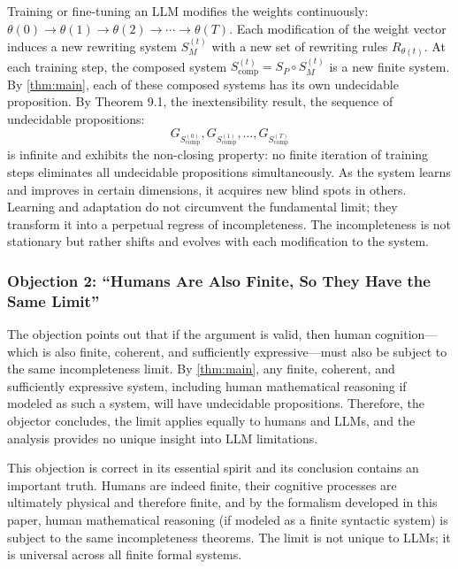 \documentclass[11pt]{article}
\begin{document}
Training or fine-tuning an LLM modifies the weights continuously: $\theta(0) \to \theta(1) \to \theta(2) \to \cdots \to \theta(T)$. Each modification of the weight vector induces a new rewriting system $S_M^{(t)}$ with a new set of rewriting rules $R_{\theta(t)}$. At each training step, the composed system $S_{\text{comp}}^{(t)} = S_P \circ S_M^{(t)}$ is a new finite system. By \ref{thm:main}, each of these composed systems has its own undecidable proposition. By Theorem 9.1, the inextensibility result, the sequence of undecidable propositions:
\begin{equation}
G_{S_{\text{comp}}^{(0)}}, G_{S_{\text{comp}}^{(1)}}, \ldots, G_{S_{\text{comp}}^{(T)}}
\end{equation}
is infinite and exhibits the non-closing property: no finite iteration of training steps eliminates all undecidable propositions simultaneously. As the system learns and improves in certain dimensions, it acquires new blind spots in others. Learning and adaptation do not circumvent the fundamental limit; they transform it into a perpetual regress of incompleteness. The incompleteness is not stationary but rather shifts and evolves with each modification to the system.

\subsubsection{Objection 2: ``Humans Are Also Finite, So They Have the Same Limit''}

The objection points out that if the argument is valid, then human cognition—which is also finite, coherent, and sufficiently expressive—must also be subject to the same incompleteness limit. By \ref{thm:main}, any finite, coherent, and sufficiently expressive system, including human mathematical reasoning if modeled as such a system, will have undecidable propositions. Therefore, the objector concludes, the limit applies equally to humans and LLMs, and the analysis provides no unique insight into LLM limitations.

This objection is correct in its essential spirit and its conclusion contains an important truth. Humans are indeed finite, their cognitive processes are ultimately physical and therefore finite, and by the formalism developed in this paper, human mathematical reasoning (if modeled as a finite syntactic system) is subject to the same incompleteness theorems. The limit is not unique to LLMs; it is universal across all finite formal systems.
\end{document}
